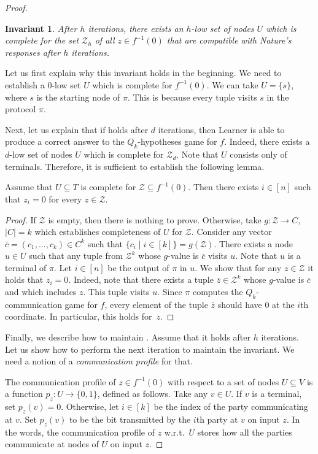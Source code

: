 \documentclass{toc}
\newtheorem{invariant}[theorem]{Invariant}
\begin{document}
\begin{proof}
\begin{invariant}
\label{invar1}
After $h$ iterations, there exists an $h$-low set of nodes $U$ which is complete for the set $\mathcal{Z}_h$ of all $z\in f^{-1}(0)$ that are compatible with Nature's responses after $h$ iterations.
\end{invariant}
Let us first explain why this invariant holds in the beginning. We need to establish a $0$-low set $U$ which is complete for $f^{-1}(0)$. We can take $U = \{s\}$, where $s$ is the starting node of $\pi$. This is because every tuple visits $s$ in the protocol $\pi$.

Next, let us explain that if  holds after $d$ iterations, then Learner is able to produce a correct answer to the $Q_k$-hypotheses game for $f$. Indeed, there exists a $d$-low set of nodes $U$ which is complete for $\mathcal{Z}_d$. Note that $U$ consists only of terminals. Therefore, it is sufficient to establish the following lemma.

\begin{lemma}
\label{complete_lemma}
Assume that $U\subseteq T$ is complete for $\mathcal{Z} \subseteq f^{-1}(0)$. Then there exists $i\in [n]$ such that $z_i = 0$ for every $z\in\mathcal{Z}$.
\end{lemma}
\begin{proof}
If $\mathcal{Z}$ is empty, then there is nothing to prove. Otherwise, take $g\colon\mathcal{Z} \to C$, $|C| = k$ which establishes completeness of $U$ for $\mathcal{Z}$.  Consider any vector $\bar{c} = (c_1, \ldots, c_k) \in C^k$  such that $\{ c_i \mid i\in [k]\} = g(\mathcal{Z})$. There exists a node $u\in U$ such that any tuple from $\mathcal{Z}^k$  whose $g$-value is $\bar{c}$ visits $u$. Note that $u$ is a terminal of $\pi$. Let $i\in[n]$ be the output of $\pi$ in $u$. We show that for any $z\in\mathcal{Z}$ it holds that $z_i = 0$. Indeed, note that there exists a tuple  $\bar{z}\in\mathcal{Z}^k$  whose $g$-value is $\bar{c}$ and which includes $z$.  This tuple visits $u$. Since $\pi$ computes the $Q_k$-communication game for $f$, every element of the tuple $\bar{z}$ should have $0$ at the $i$th coordinate. In particular, this holds for~$z$.
\end{proof}
Finally, we describe how to maintain .
Assume that it holds after $h$ iterations. Let us show how to perform the next iteration to maintain the invariant. We need a notion of a \emph{communication profile} for that.

The communication profile of $z\in f^{-1}(0)$ with respect to a set of nodes $U\subseteq V$ is a function $p_z\colon U \to \{0, 1\}$, defined as follows. Take any $v\in U$. If $v$ is a terminal, set $p_z(v) = 0$. Otherwise, let $i\in [k]$ be the index of the party communicating at $v$. Set $p_z(v)$ to be the bit transmitted by the $i$th party at $v$ on input $z$. In the words, the communication profile of $z$ w.r.t.~$U$ stores how all the parties communicate at nodes of $U$ on input $z$.


\end{proof}
\end{document}
